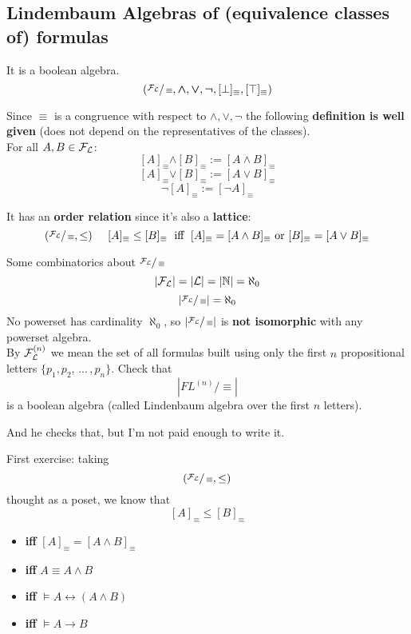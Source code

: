 	\newpage

	\subsection{Lindembaum Algebras of (equivalence classes of) formulas}
	It is a boolean algebra.\\

	$$ (\sfrac{\mathcal{F}_\mathcal{L}}{\equiv}, \bm{\wedge}, \bm{\vee}, \bm{\neg}, [\bot]_\equiv, [\top]_\equiv) $$

	Since $\equiv$ is a congruence with respect to $\wedge, \vee, \neg$ the following \textbf{definition is well given} (does not depend on the representatives of the classes).\\

	For all $A, B \in \mathcal{F}_\mathcal{L}$:
	$$ [A]_\equiv \bm{\wedge} [B]_\equiv := [A \wedge B]_\equiv $$
	$$ [A]_\equiv \bm{\vee} [B]_\equiv := [A \vee B]_\equiv $$
	$$ \neg [A]_\equiv := [\neg A]_\equiv $$

	It has an \textbf{order relation} since it's also a \textbf{lattice}:
	$$ (\sfrac{\mathcal{F}_\mathcal{L}}{\equiv}, \leq) \;\;\;\;\; [A]_\equiv \leq [B]_\equiv  \; \text{ iff } \; [A]_\equiv = [A \wedge B]_\equiv \text{ or } [B]_\equiv = [A \vee B]_\equiv $$

	Some combinatorics about $\sfrac{\mathcal{F}_\mathcal{L}}{\equiv}$
	$$ |\mathcal{F}_\mathcal{L}| = |\mathcal{L}| = |\mathbb{N}| = \aleph_0 $$
	$$ |\sfrac{\mathcal{F}_\mathcal{L}}{\equiv}| = \aleph_0 $$
	No powerset has cardinality $\aleph_0$, so $|\sfrac{\mathcal{F}_\mathcal{L}}{\equiv}|$ is \textbf{not isomorphic} with any powerset algebra.\\

	By $\mathcal{F}_\mathcal{L}^{(n)}$ we mean the set of all formulas built using only the first $n$ propositional letters $\{p_1, p_2, \, ... \, , p_n\}$. Check that  %
	$$ |FL^{(n)}/\equiv|$$
	is a boolean algebra (called Lindenbaum algebra over the first $n$ letters).\\

	\vfill

	And he checks that, but I'm not paid enough to write it.\\



	\newpage

	First exercise: taking
	$$ (\sfrac{\mathcal{F}_\mathcal{L}}{\equiv}, \leq)$$
	thought as a poset, we know that
	$$ [A]_\equiv \leq [B]_\equiv $$

	\begin{itemize}[label*=]
		\item \textbf{iff} $[A]_\equiv = [A \wedge B]_\equiv $
		\item \textbf{iff} $A \equiv A \wedge B$
		\item \textbf{iff} $\models A \leftrightarrow (A \wedge B)$
		\item \textbf{iff} $\models A \rightarrow B$
	\end{itemize}

